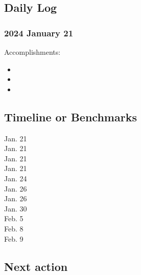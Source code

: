 \documentclass[10pt,letterpaper]{article}
\newcommand{\bi}{\begin{itemize}}
\newcommand{\ei}{\end{itemize}}
\begin{document}
\begin{description}

\subsection{Daily Log}
\label{sub:daily-log}


\subsubsection{2024 January 21}

Accomplishments:
\bi
\item 
\item
\item
\ei

\subsection{Timeline or Benchmarks}
\label{sub:benchmarks}



\begin{description}
\item [Jan. 21]
\item [Jan. 21]
\item [Jan. 21] 
\item [Jan. 21] 
\item [Jan. 24] 
\item [Jan. 26]
\item [Jan. 26]
\item [Jan. 30] 
\item [Feb. 5] 
\item [Feb. 8]
\item [Feb. 9]
\end{description}

\subsection{Next action}
\label{sub:next}



\end{description}
\end{document}
